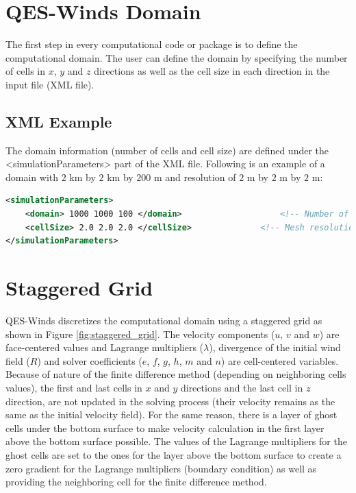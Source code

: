 \section{QES-Winds Domain}

The first step in every computational code or package is to define the computational domain. The user can define the domain by specifying the number of cells in $x$, $y$ and $z$ directions as well as the cell size in each direction in the input file (XML file).

\subsection{XML Example}

The domain information (number of cells and cell size) are defined under the <simulationParameters> part of the XML file. Following is an example of a domain with $2$ km by $2$ km by $200$ m and resolution of $2$ m by $2$ m by $2$ m:

\begin{lstlisting}[language=XML]
<simulationParameters>
  	<domain> 1000 1000 100 </domain>					<!-- Number of cells in x,y and z directions-->
  	<cellSize> 2.0 2.0 2.0 </cellSize> 				<!-- Mesh resolution (meters)-->
</simulationParameters>
\end{lstlisting}

\section{Staggered Grid}

QES-Winds discretizes the computational domain using a staggered grid as shown in Figure \ref{fig:staggered_grid}. The velocity components ($u$, $v$ and $w$) are face-centered values and Lagrange multipliers ($\lambda$), divergence of the initial wind field ($R$) and solver coefficients ($e$, $f$, $g$, $h$, $m$ and $n$) are cell-centered variables. Because of nature of the finite difference method (depending on neighboring cells values), the first and last cells in $x$ and $y$ directions and the last cell in $z$ direction, are not updated in the solving process (their velocity remains as the same as the initial velocity field). For the same reason, there is a layer of ghost cells under the bottom surface to make velocity calculation in the first layer above the bottom surface possible. The values of the Lagrange multipliers for the ghost cells are set to the ones for the layer above the bottom surface to create a zero gradient for the Lagrange multipliers (boundary condition) as well as providing the neighboring cell for the finite difference method.

